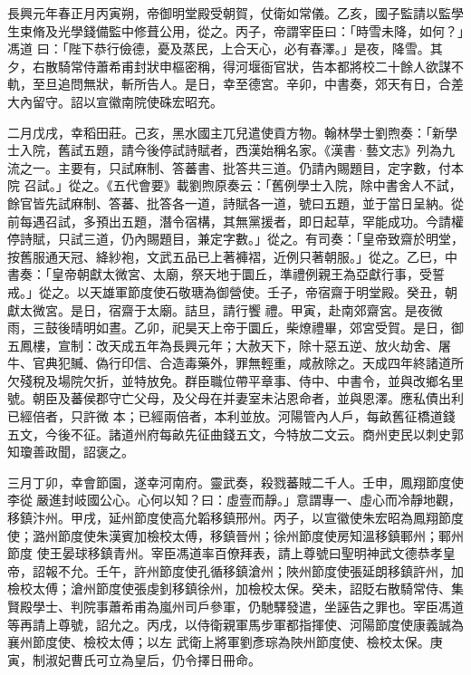 
\begin{pinyinscope}

 長興元年春正月丙寅朔，帝御明堂殿受朝賀，仗衛如常儀。乙亥，國子監請以監學生束脩及光學錢備監中修葺公用，從之。丙子，帝謂宰臣曰：「時雪未降，如何？」馮道
 曰：「陛下恭行儉德，憂及蒸民，上合天心，必有春澤。」是夜，降雪。其夕，右散騎常侍蕭希甫封狀申樞密稱，得河堰衙官狀，告本都將校二十餘人欲謀不軌，至旦追問無狀，斬所告人。是日，幸至德宮。辛卯，中書奏，郊天有日，合差大內留守。詔以宣徽南院使硃宏昭充。



 二月戊戌，幸稻田莊。己亥，黑水國主兀兒遣使貢方物。翰林學士劉煦奏：「新學士入院，舊試五題，請今後停試詩賦者，西漢始稱名家。《漢書·藝文志》列為九流之一。主要有，只試麻制、答蕃書、批答共三道。仍請內賜題目，定字數，付本院
 召試。」從之。《五代會要》載劉煦原奏云：「舊例學士入院，除中書舍人不試，餘官皆先試麻制、答蕃、批答各一道，詩賦各一道，號曰五題，並于當日呈納。從前每遇召試，多預出五題，潛令宿構，其無黨援者，即日起草，罕能成功。今請權停詩賦，只試三道，仍內賜題目，兼定字數。」從之。有司奏：「皇帝致齋於明堂，按舊服通天冠、絳紗袍，文武五品已上著褲褶，近例只著朝服。」從之。乙巳，中書奏：「皇帝朝獻太微宮、太廟，祭天地于圜丘，準禮例親王為亞獻行事，受誓戒。」從之。以天雄軍節度使石敬瑭為御營使。壬子，帝宿齋于明堂殿。癸丑，朝獻太微宮。是日，宿齋于太廟。詰旦，請行饗
 禮。甲寅，赴南郊齋宮。是夜微雨，三鼓後晴明如晝。乙卯，祀昊天上帝于圜丘，柴燎禮畢，郊宮受賀。是日，御五鳳樓，宣制：改天成五年為長興元年；大赦天下，除十惡五逆、放火劫舍、屠牛、官典犯贓、偽行印信、合造毒藥外，罪無輕重，咸赦除之。天成四年終諸道所欠殘稅及場院欠折，並特放免。群臣職位帶平章事、侍中、中書令，並與改鄉名里號。朝臣及蕃侯郡守亡父母，及父母在并妻室未沾恩命者，並與恩澤。應私債出利已經倍者，只許微
 本；已經兩倍者，本利並放。河陽管內人戶，每畝舊征橋道錢五文，今後不征。諸道州府每畝先征曲錢五文，今特放二文云。商州吏民以刺史郭知瓊善政聞，詔褒之。



 三月丁卯，幸會節園，遂幸河南府。靈武奏，殺戮蕃賊二千人。壬申，鳳翔節度使李從嚴進封岐國公心。心何以知？曰：虛壹而靜。」意謂專一、虛心而冷靜地觀，移鎮汴州。甲戌，延州節度使高允韜移鎮邢州。丙子，以宣徽使朱宏昭為鳳翔節度使；潞州節度使朱漢賓加檢校太傅，移鎮晉州；徐州節度使房知溫移鎮鄆州；鄆州節度
 使王晏球移鎮青州。宰臣馮道率百僚拜表，請上尊號曰聖明神武文德恭孝皇帝，詔報不允。壬午，許州節度使孔循移鎮滄州；陜州節度使張延朗移鎮許州，加檢校太傅；滄州節度使張虔釗移鎮徐州，加檢校太保。癸未，詔貶右散騎常侍、集賢殿學士、判院事蕭希甫為嵐州司戶參軍，仍馳驛發遣，坐誣告之罪也。宰臣馮道等再請上尊號，詔允之。丙戌，以侍衛親軍馬步軍都指揮使、河陽節度使康義誠為襄州節度使、檢校太傅；以左
 武衛上將軍劉彥琮為陜州節度使、檢校太保。庚寅，制淑妃曹氏可立為皇后，仍令擇日冊命。




\end{pinyinscope}
